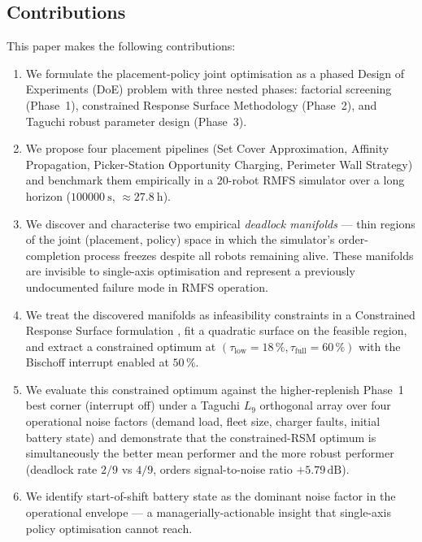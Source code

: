 \documentclass[conference]{IEEEtran}
\begin{document}
\subsection{Contributions}
This paper makes the following contributions:
\begin{enumerate}
  \item We formulate the placement-policy joint optimisation as a phased Design of Experiments (DoE) problem with three nested phases: factorial screening (Phase~1), constrained Response Surface Methodology (Phase~2), and Taguchi robust parameter design (Phase~3).
  \item We propose four placement pipelines (Set Cover Approximation, Affinity Propagation, Picker-Station Opportunity Charging, Perimeter Wall Strategy) and benchmark them empirically in a 20-robot RMFS simulator over a long horizon ($\SI{100000}{\second}$, $\approx\SI{27.8}{\hour}$).
  \item We discover and characterise two empirical \emph{deadlock manifolds} --- thin regions of the joint (placement, policy) space in which the simulator's order-completion process freezes despite all robots remaining alive. These manifolds are invisible to single-axis optimisation and represent a previously undocumented failure mode in RMFS operation.
  \item We treat the discovered manifolds as infeasibility constraints in a Constrained Response Surface formulation \cite{myers2016}, fit a quadratic surface on the feasible region, and extract a constrained optimum at $(\tau_\text{low}=18\,\%, \tau_\text{full}=60\,\%)$ with the Bischoff interrupt enabled at $50\,\%$.
  \item We evaluate this constrained optimum against the higher-replenish Phase~1 best corner (interrupt off) under a Taguchi $L_9$ orthogonal array over four operational noise factors (demand load, fleet size, charger faults, initial battery state) and demonstrate that the constrained-RSM optimum is simultaneously the better mean performer and the more robust performer (deadlock rate $2/9$ vs $4/9$, orders signal-to-noise ratio $+5.79\,\text{dB}$).
  \item We identify start-of-shift battery state as the dominant noise factor in the operational envelope --- a managerially-actionable insight that single-axis policy optimisation cannot reach.
\end{enumerate}
\end{document}
